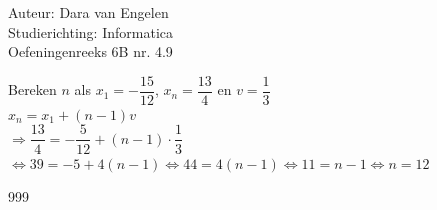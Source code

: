 \documentclass[a4paper]{article}
\begin{document}
	
\noindent \large Auteur: Dara van Engelen     \\
\noindent \large Studierichting: Informatica \\
\noindent \large Oefeningenreeks 6B nr. 4.9 \\
	
\medskip
	
\normalsize

Bereken $n$ als $x_1 = -\dfrac{15}{12}$, $x_n = \dfrac{13}{4}$ en $v= \dfrac{1}{3}$\\

$x_n = x_1 + (n-1)v$\\

$\Rightarrow \dfrac{13}{4} = -\dfrac{5}{12} + (n-1)\cdot\dfrac{1}{3}$\\

$\Leftrightarrow 39 = -5 + 4(n-1) \Leftrightarrow 44 = 4(n-1) \Leftrightarrow 11 = n-1 \Leftrightarrow n = 12$\\
	
\begin{thebibliography}{999}
\end{thebibliography}
\end{document}
